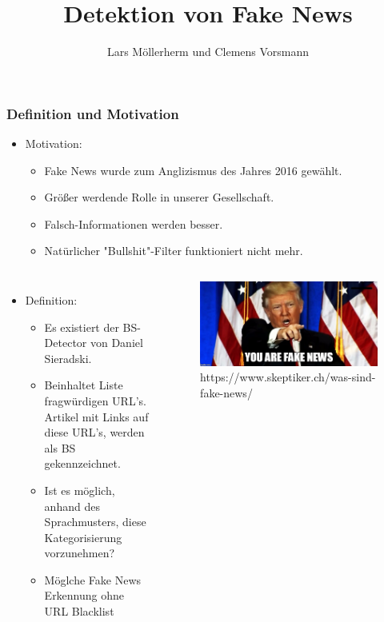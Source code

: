 \documentclass[aspectratio=1610, professionalfonts, 9pt]{beamer}
\title{Detektion von Fake News}
\author{Lars Möllerherm und Clemens Vorsmann}
\institute{Fakultät Physik}
\begin{document}
  \begin{frame}
    \titlepage
  \end{frame}

  \begin{frame}
    \frametitle{Definition und Motivation}
    \begin{itemize}
      \item Motivation:
      \begin{itemize}
        \item Fake News wurde zum Anglizismus des Jahres 2016 gewählt\cite{angli}.
        \item Größer werdende Rolle in unserer Gesellschaft.
        \item Falsch-Informationen werden besser.
        \item Natürlicher "Bullshit"-Filter funktioniert nicht mehr.
      \end{itemize}
    \end{itemize}
    \begin{columns}
      \begin{itemize}
        \item Definition:
        \begin{itemize}
        \item Es existiert der BS-Detector von Daniel Sieradski\cite{BS}.
        \item Beinhaltet Liste fragwürdigen URL's. Artikel mit Links auf diese URL's, 
            werden als BS gekennzeichnet.
        \item Ist es möglich, anhand des Sprachmusters, diese Kategorisierung vorzunehmen?
        \item Möglche Fake News Erkennung ohne URL Blacklist
        \end{itemize}
      \end{itemize}
      \begin{figure}
          \includegraphics[width=\textwidth]{pictures/trump-fake-news.jpg}
          \caption{https://www.skeptiker.ch/was-sind-fake-news/}
          \label{}
        \end{figure}
      \end{columns}
  \end{frame}
\end{document}
